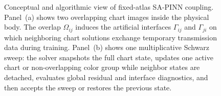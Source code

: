 \documentclass[sort&compress]{svjour3} %
\begin{document}
\begin{figure}[htbp]
{%
}%
\caption{Conceptual and algorithmic view of fixed-atlas SA-PINN coupling. Panel~(a) shows two overlapping chart images inside the physical body. The overlap $\Omega_{ij}$ induces the artificial interfaces $\Gamma_{ij}$ and $\Gamma_{ji}$ on which neighboring chart solutions exchange temporary transmission data during training. Panel~(b) shows one multiplicative Schwarz sweep: the solver snapshots the full chart state, updates one active chart or non-overlapping color group while neighbor states are detached, evaluates global residual and interface diagnostics, and then accepts the sweep or restores the previous state.}
\label{fig:schwarz_schematic}
\end{figure}
\end{document}
